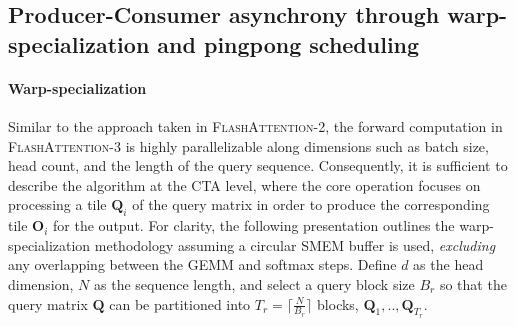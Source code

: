 \subsection{Producer-Consumer asynchrony through warp-specialization and pingpong scheduling}
\label{sec:algo_ws}

\paragraph{Warp-specialization}
Similar to the approach taken in \textsc{FlashAttention-2}, the forward computation in \textsc{FlashAttention-3} is highly parallelizable along dimensions such as batch size, head count, and the length of the query sequence. Consequently, it is sufficient to describe the algorithm at the CTA level, where the core operation focuses on processing a tile $\mathbf{Q}_i$ of the query matrix in order to produce the corresponding tile $\mathbf{O}_i$ for the output. For clarity, the following presentation outlines the warp-specialization methodology assuming a circular SMEM buffer is used, \emph{excluding} any overlapping between the GEMM and softmax steps. Define $d$ as the head dimension, $N$ as the sequence length, and select a query block size $B_r$ so that the query matrix $\mathbf{Q}$ can be partitioned into $T_r = \lceil \frac{N}{B_r} \rceil$ blocks, $\mathbf{Q}_1, .., \mathbf{Q}_{T_r}$.

